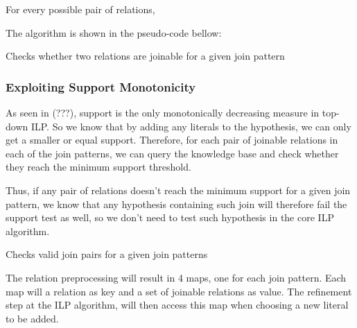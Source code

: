 For every possible pair of relations, 

The algorithm is shown in the pseudo-code bellow:

\begin{algorithm}[5]
 \caption{Checks whether two relations are joinable for a given join pattern}
 
\end{algorithm}

\subsubsection{Exploiting Support Monotonicity}

As seen in (???), support is the only monotonically decreasing measure in top-down ILP. So we know that by adding any literals to the hypothesis, we can only get a smaller or equal support. Therefore, for each pair of joinable relations in each of the join patterns, we can query the knowledge base and check whether they reach the minimum support threshold.

Thus, if any pair of relations doesn't reach the minimum support for a given join pattern, we know that any hypothesis containing such join will therefore fail the support test as well, so we don't need to test such hypothesis in the core ILP algorithm.


\begin{algorithm}
  \caption{Checks valid join pairs for a given join patterns}
  
\end{algorithm}


The relation preprocessing will result in 4 maps, one for each join pattern. Each map will a relation as key and a set of joinable relations as value. The refinement step at the ILP algorithm, will then access this map when choosing a new literal to be added.


